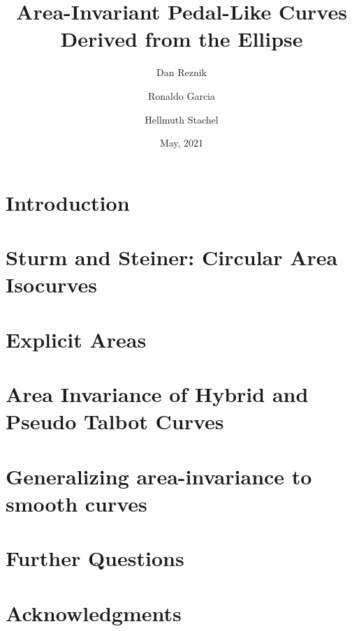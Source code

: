 \documentclass{amsart}
\title[Area-Invariant Pedal-Like Curves]{Area-Invariant Pedal-Like Curves\\Derived from the Ellipse}
\author[D. Reznik]{Dan Reznik}
\author[R. Garcia]{Ronaldo Garcia}
\author[H. Stachel]{Hellmuth Stachel}
\date{May, 2021}
\begin{document}
\maketitle



\section{Introduction}
\label{sec:intro}


\section{Sturm and Steiner: Circular Area Isocurves}
\label{sec:review-steiner}


\section{Explicit Areas}
\label{sec:explicit}


\section{Area Invariance of Hybrid and Pseudo Talbot Curves}
\label{sec:main-results}


\section{Generalizing area-invariance to   smooth curves}

\label{sec:epilogue}

\section{Further Questions}


%

\section*{Acknowledgments}


\appendix
\end{document}
